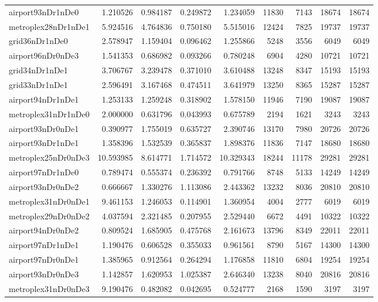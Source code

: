 \begin{longtable}{|l|r|r|r|r|r|r|r|r|}
airport93nDr1nDe0 & 1.210526 & 0.984187 & 0.249872 & 1.234059 & 11830 & 7143 & 18674 & 18674 \\
metroplex28nDr1nDe1 & 5.924516 & 4.764836 & 0.750180 & 5.515016 & 12424 & 7825 & 19737 & 19737 \\
grid36nDr1nDe0 & 2.578947 & 1.159404 & 0.096462 & 1.255866 & 5248 & 3556 & 6049 & 6049 \\
airport96nDr0nDe3 & 1.541353 & 0.686982 & 0.093266 & 0.780248 & 6904 & 4280 & 10721 & 10721 \\
grid34nDr1nDe1 & 3.706767 & 3.239478 & 0.371010 & 3.610488 & 13248 & 8347 & 15193 & 15193 \\
grid33nDr1nDe1 & 2.596491 & 3.167468 & 0.474511 & 3.641979 & 13250 & 8365 & 15287 & 15287 \\
airport94nDr1nDe1 & 1.253133 & 1.259248 & 0.318902 & 1.578150 & 11946 & 7190 & 19087 & 19087 \\
metroplex31nDr1nDe0 & 2.000000 & 0.631796 & 0.043993 & 0.675789 & 2194 & 1621 & 3243 & 3243 \\
airport93nDr0nDe1 & 0.390977 & 1.755019 & 0.635727 & 2.390746 & 13170 & 7980 & 20726 & 20726 \\
airport93nDr1nDe1 & 1.358396 & 1.532539 & 0.365837 & 1.898376 & 11836 & 7147 & 18680 & 18680 \\
metroplex25nDr0nDe3 & 10.593985 & 8.614771 & 1.714572 & 10.329343 & 18244 & 11178 & 29281 & 29281 \\
airport97nDr1nDe0 & 0.789474 & 0.555374 & 0.236392 & 0.791766 & 8748 & 5133 & 14249 & 14249 \\
airport93nDr0nDe2 & 0.666667 & 1.330276 & 1.113086 & 2.443362 & 13232 & 8036 & 20810 & 20810 \\
metroplex31nDr0nDe1 & 9.461153 & 1.246053 & 0.114901 & 1.360954 & 4004 & 2777 & 6019 & 6019 \\
metroplex29nDr0nDe2 & 4.037594 & 2.321485 & 0.207955 & 2.529440 & 6672 & 4491 & 10322 & 10322 \\
airport94nDr0nDe2 & 0.809524 & 1.685905 & 0.475768 & 2.161673 & 13796 & 8349 & 22011 & 22011 \\
airport97nDr1nDe1 & 1.190476 & 0.606528 & 0.355033 & 0.961561 & 8790 & 5167 & 14300 & 14300 \\
airport97nDr0nDe1 & 1.385965 & 0.912564 & 0.264294 & 1.176858 & 11810 & 6804 & 19254 & 19254 \\
airport93nDr0nDe3 & 1.142857 & 1.620953 & 1.025387 & 2.646340 & 13238 & 8040 & 20816 & 20816 \\
metroplex31nDr0nDe3 & 9.190476 & 0.482082 & 0.042695 & 0.524777 & 2168 & 1590 & 3197 & 3197 \\

\end{longtable}
